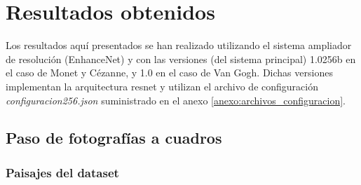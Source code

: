 \documentclass[[../main.tex]{subfiles}
\begin{document}
\section{Resultados obtenidos}

Los resultados aquí presentados se han realizado utilizando el sistema ampliador de resolución (EnhanceNet) y con las versiones (del sistema principal) 1.0\textunderscore 256b en el caso de Monet y Cézanne, y 1.0 en el caso de Van Gogh. Dichas versiones implementan la arquitectura resnet y utilizan el archivo de configuración \textit{configuracion\textunderscore 256.json} suministrado en el anexo \ref{anexo:archivos_configuracion}.

\subsection{Paso de fotografías a cuadros}
\subsubsection{Paisajes del dataset}
\end{document}
